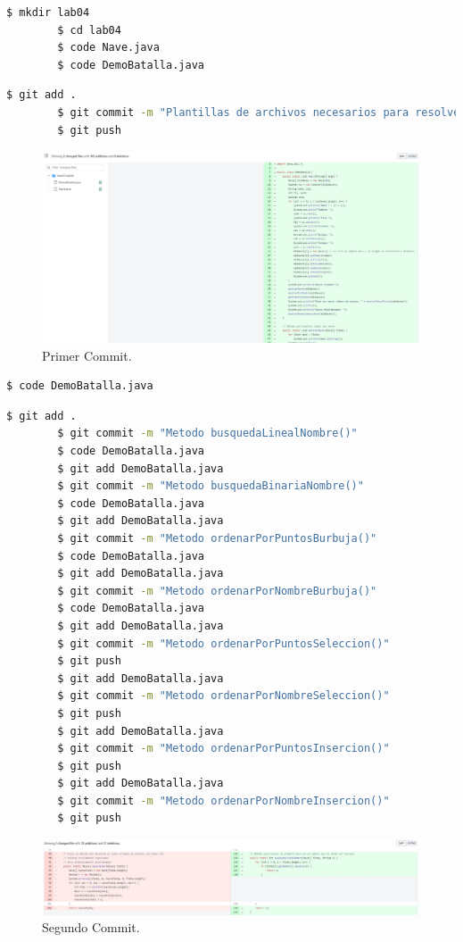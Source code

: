 \documentclass{article}
\begin{document}
\begin{lstlisting}[language=bash,caption={Creando plantillas}]
		$ mkdir lab04
		$ cd lab04
		$ code Nave.java
		$ code DemoBatalla.java
	\end{lstlisting}
\begin{lstlisting}[language=bash,caption={Primer Commit / Plantillas}]
		$ git add .
		$ git commit -m "Plantillas de archivos necesarios para resolver las actividades del laboratorio"
		$ git push
	\end{lstlisting}
\begin{figure}[H]
	\centering
	\includegraphics[width=1\textwidth,keepaspectratio]{img/commit01.jpg}
	\caption{Primer Commit.}
\end{figure}
\begin{lstlisting}[language=bash,caption={Actualizando DemoBatalla.java}]
		$ code DemoBatalla.java
	\end{lstlisting}
\begin{lstlisting}[language=bash,caption={Segundo - Noveno Commit / DemoBatalla.java}]
		$ git add .
		$ git commit -m "Metodo busquedaLinealNombre()"
		$ code DemoBatalla.java
		$ git add DemoBatalla.java
		$ git commit -m "Metodo busquedaBinariaNombre()"
		$ code DemoBatalla.java
		$ git add DemoBatalla.java
		$ git commit -m "Metodo ordenarPorPuntosBurbuja()"
		$ code DemoBatalla.java
		$ git add DemoBatalla.java
		$ git commit -m "Metodo ordenarPorNombreBurbuja()"
		$ code DemoBatalla.java
		$ git add DemoBatalla.java
		$ git commit -m "Metodo ordenarPorPuntosSeleccion()"
		$ git push
		$ git add DemoBatalla.java
		$ git commit -m "Metodo ordenarPorNombreSeleccion()"
		$ git push
		$ git add DemoBatalla.java
		$ git commit -m "Metodo ordenarPorPuntosInsercion()"
		$ git push
		$ git add DemoBatalla.java
		$ git commit -m "Metodo ordenarPorNombreInsercion()"
		$ git push
	\end{lstlisting}
\begin{figure}[H]
	\centering
	\includegraphics[width=1\textwidth,keepaspectratio]{img/commit02.jpg}
	\caption{Segundo Commit.}
\end{figure}
\end{document}
